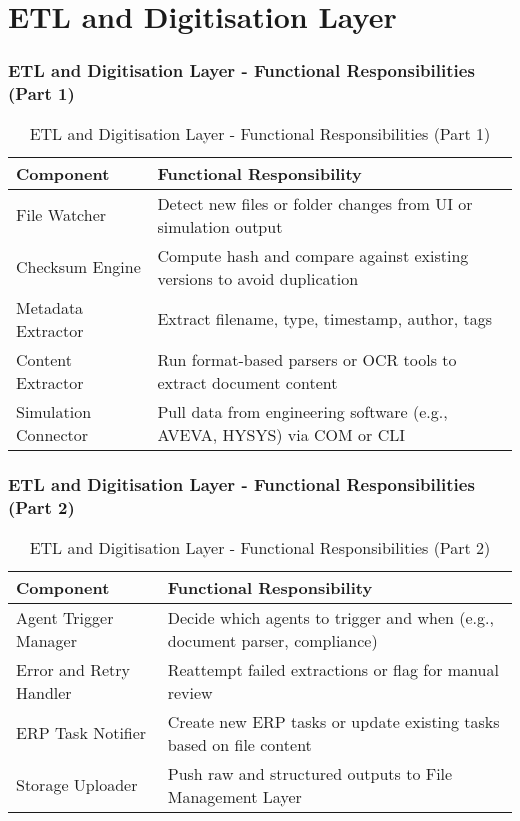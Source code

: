 \section{ETL and Digitisation Layer}

\begin{frame}
    \frametitle{ETL and Digitisation Layer - Functional Responsibilities (Part 1)}
    \begin{table}[h!]
\centering
\renewcommand{\arraystretch}{1.2}
\begin{tabular}{|p{3cm}|p{7cm}|}
\hline
\textbf{Component} & \textbf{Functional Responsibility} \\
\hline
File Watcher & Detect new files or folder changes from UI or simulation output \\
\hline
Checksum Engine & Compute hash and compare against existing versions to avoid duplication \\
\hline
Metadata Extractor & Extract filename, type, timestamp, author, tags \\
\hline
Content Extractor & Run format-based parsers or OCR tools to extract document content \\
\hline
Simulation Connector & Pull data from engineering software (e.g., AVEVA, HYSYS) via COM or CLI \\
\hline
\end{tabular}
\caption{ETL and Digitisation Layer - Functional Responsibilities (Part 1)}
\end{table}
\end{frame}

\begin{frame}
    \frametitle{ETL and Digitisation Layer - Functional Responsibilities (Part 2)}
    \begin{table}[h!]
\centering
\renewcommand{\arraystretch}{1.2}
\begin{tabular}{|p{3cm}|p{7cm}|}
\hline
\textbf{Component} & \textbf{Functional Responsibility} \\
\hline
Agent Trigger Manager & Decide which agents to trigger and when (e.g., document parser, compliance) \\
\hline
Error and Retry Handler & Reattempt failed extractions or flag for manual review \\
\hline
ERP Task Notifier & Create new ERP tasks or update existing tasks based on file content \\
\hline
Storage Uploader & Push raw and structured outputs to File Management Layer \\
\hline
\end{tabular}
\caption{ETL and Digitisation Layer - Functional Responsibilities (Part 2)}
\end{table}
\end{frame}

